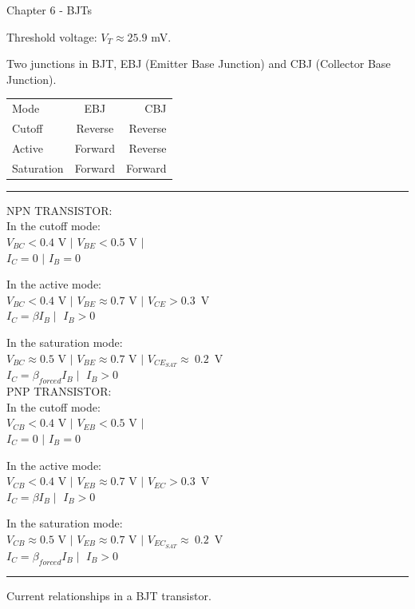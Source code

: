\documentclass[a4paper]{article}
\newcommand{\hrl}{
    \vspace{2mm}
    \hrule
    \vspace{2mm}
}
\begin{document}
\begin{multicols}{3}
\setlength{\abovedisplayskip}{2pt}
\setlength{\belowdisplayskip}{0pt}
Chapter 6 - BJTs

Threshold voltage: $V_T\approx25.9$ mV.

%
%
Two junctions in BJT, EBJ (Emitter Base Junction)
and CBJ (Collector Base Junction).

\begin{tabular}{l|c|r}
    Mode & EBJ & CBJ \\
    Cutoff & Reverse & Reverse \\
    Active & Forward & Reverse \\
    Saturation & Forward & Forward
\end{tabular}

\hrl

NPN TRANSISTOR:\\
In the cutoff mode:\\
$V_{BC}<0.4$ V $\mid$
$V_{BE}<0.5$ V $\mid$\\
$I_C=0$ $\mid$
$I_B=0$

In the active mode:\\
$V_{BC}<0.4$ V $\mid$
$V_{BE}\approx 0.7$ V $\mid$
$V_{CE}>0.3$~V\\
$I_C=\beta I_B \mid$
$I_B > 0$

In the saturation mode:\\
$V_{BC}\approx 0.5$ V $\mid$
$V_{BE}\approx 0.7$ V $\mid$
$V_{CE_{SAT}}\approx~0.2$~V\\
$I_C=\beta_{forced}I_B\mid$
$I_B>0$\\

PNP TRANSISTOR:\\
In the cutoff mode:\\
$V_{CB}<0.4$ V $\mid$
$V_{EB}<0.5$ V $\mid$\\
$I_C=0$ $\mid$
$I_B=0$

In the active mode:\\
$V_{CB}<0.4$ V $\mid$
$V_{EB}\approx 0.7$ V $\mid$
$V_{EC}>0.3$~V\\
$I_C=\beta I_B \mid$
$I_B > 0$

In the saturation mode:\\
$V_{CB}\approx 0.5$ V $\mid$
$V_{EB}\approx 0.7$ V $\mid$
$V_{EC_{SAT}}\approx~0.2$~V\\
$I_C=\beta_{forced}I_B\mid$
$I_B>0$\\

\hrl

Current relationships in a BJT transistor.


\end{multicols}
\end{document}
